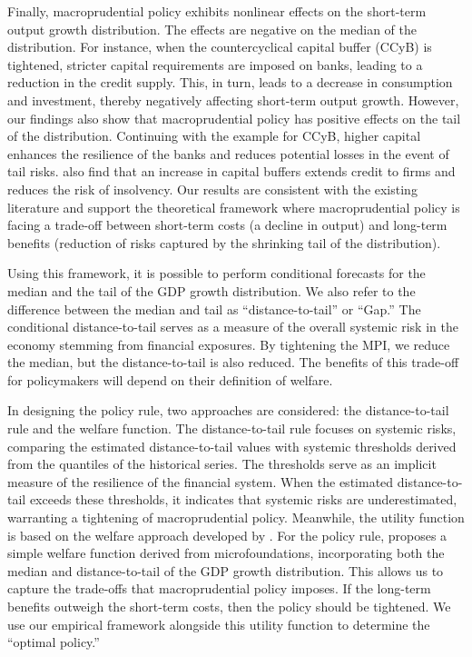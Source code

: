 Finally, macroprudential policy exhibits nonlinear effects on the short-term output growth distribution. The effects are negative on the median of the distribution. For instance, when the countercyclical capital buffer (CCyB) is tightened, stricter capital requirements are imposed on banks, leading to a reduction in the credit supply. This, in turn, leads to a decrease in consumption and investment, thereby negatively affecting short-term output growth. However, our findings also show that macroprudential policy has positive effects on the tail of the distribution. Continuing with the example for CCyB, higher capital enhances the resilience of the banks and reduces potential losses in the event of tail risks. \citet{jimnez2017} also find that an increase in capital buffers extends credit to firms and reduces the risk of insolvency. Our results are consistent with the existing literature \citep{galan2020} and support the theoretical framework where macroprudential policy is facing a trade-off between short-term costs (a decline in output) and long-term benefits (reduction of risks captured by the shrinking tail of the distribution).

Using this framework, it is possible to perform conditional forecasts for the median and the tail of the GDP growth distribution. We also refer to the difference between the median and tail as “distance-to-tail” or “Gap.” The conditional distance-to-tail serves as a measure of the overall systemic risk in the economy stemming from financial exposures. By tightening the MPI, we reduce the median, but the distance-to-tail is also reduced. The benefits of this trade-off for policymakers will depend on their definition of welfare.

In designing the policy rule, two approaches are considered: the distance-to-tail rule \citep{esrb2024} and the \citet{suarez2022} welfare function. The distance-to-tail rule focuses on systemic risks, comparing the estimated distance-to-tail values with systemic thresholds derived from the quantiles of the historical series. The thresholds serve as an implicit measure of the resilience of the financial system. When the estimated distance-to-tail exceeds these thresholds, it indicates that systemic risks are underestimated, warranting a tightening of macroprudential policy. Meanwhile, the utility function is based on the welfare approach developed by \citet{suarez2022}. For the policy rule, \citet{suarez2022} proposes a simple welfare function derived from microfoundations, incorporating both the median and distance-to-tail of the GDP growth distribution. This allows us to capture the trade-offs that macroprudential policy imposes. If the long-term benefits outweigh the short-term costs, then the policy should be tightened. We use our empirical framework alongside this utility function to determine the “optimal policy.” 

